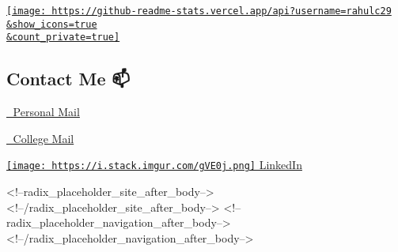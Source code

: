 \documentclass[]{tufte-handout}
\begin{document}
\href{https://github.com/anuraghazra/github-readme-stats}{\texttt{[image: https://github-readme-stats.vercel.app/api?username=rahulc29\\\&show\_icons=true\\\&count\_private=true]}}

\hypertarget{contact-me}{%
\subsection{Contact Me 📫}\label{contact-me}}

\href{rahul29112002@gmail.com}{📧 Personal Mail}

\href{iit2021096@iiita.ac.in}{📧 College Mail}

\href{https://www.linkedin.com/in/rahul-chhabra-452a3317b/}{\texttt{[image: https://i.stack.imgur.com/gVE0j.png]}
LinkedIn}


<!--radix_placeholder_site_after_body-->
<!--/radix_placeholder_site_after_body-->
<!--radix_placeholder_navigation_after_body-->
<!--/radix_placeholder_navigation_after_body-->
\end{document}
